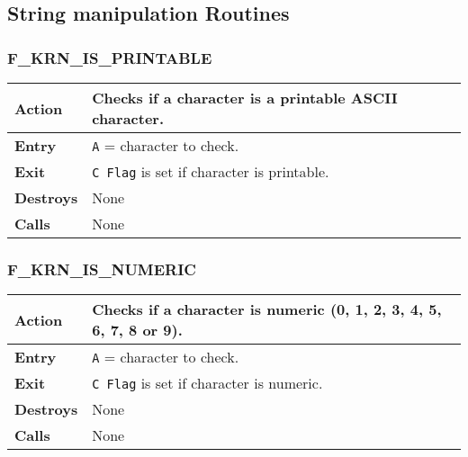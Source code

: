 \subsection{String manipulation Routines}

    \subsubsection{F\_KRN\_IS\_PRINTABLE}
    \label{func:fkrnisprintable}
    \begin{tabular}{l p{15cm}}
        \hline\textbf{Action}
        & Checks if a character is a printable ASCII character.\\
        \hline\textbf{Entry} & \texttt{A} = character to check.\\
        \hline\textbf{Exit} & \texttt{C Flag} is set if character is printable.\\
        \hline\textbf{Destroys} & None\\
        \hline\textbf{Calls} & None\\
        \hline
    \end{tabular}

    \subsubsection{F\_KRN\_IS\_NUMERIC}
    \label{func:fkrnisnumeric}
    \begin{tabular}{l p{15cm}}
        \hline\textbf{Action}
        & Checks if a character is numeric (0, 1, 2, 3, 4, 5, 6, 7, 8 or 9).\\
        \hline\textbf{Entry} & \texttt{A} = character to check.\\
        \hline\textbf{Exit} & \texttt{C Flag} is set if character is numeric.\\
        \hline\textbf{Destroys} & None\\
        \hline\textbf{Calls} & None\\
        \hline
    \end{tabular}


